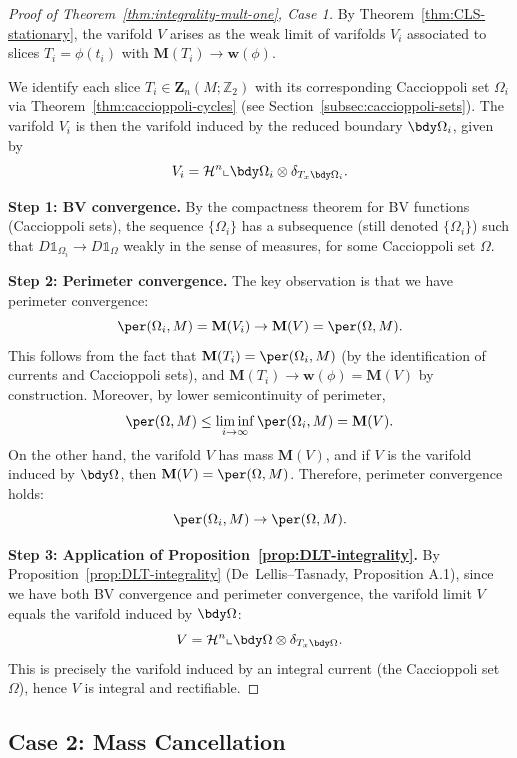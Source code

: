 \begin{proof}[Proof of Theorem~\ref{thm:integrality-mult-one}, Case 1]
By Theorem~\ref{thm:CLS-stationary}, the varifold $V$ arises as the weak limit of varifolds $V_i$
associated to slices $T_i = \phi(t_i)$ with $\mathbf{M}(T_i) \to \mathbf{w}(\phi)$.

We identify each slice $T_i \in \mathbf{Z}_n(M;\mathbb{Z}_2)$ with its corresponding Caccioppoli set
$\Omega_i$ via Theorem~\ref{thm:caccioppoli-cycles} (see Section~\ref{subsec:caccioppoli-sets}). The
varifold $V_i$ is then the varifold induced by the reduced boundary $\bdy\Omega_i$, given by
\[
    V_i = \mathcal{H}^n \llcorner \bdy\Omega_i \otimes \delta_{T_x\bdy\Omega_i}.
\]

\textbf{Step 1: BV convergence.} By the compactness theorem for BV functions (Caccioppoli sets), the
sequence $\{\Omega_i\}$ has a subsequence (still denoted $\{\Omega_i\}$) such that
$D\mathbb{1}_{\Omega_i} \to D\mathbb{1}_\Omega$ weakly in the sense of measures, for some
Caccioppoli set $\Omega$.

\textbf{Step 2: Perimeter convergence.} The key observation is that we have perimeter convergence:
\[
    \per(\Omega_i, M) = \mathbf{M}(V_i) \to \mathbf{M}(V) = \per(\Omega, M).
\]
This follows from the fact that $\mathbf{M}(T_i) = \per(\Omega_i, M)$ (by the identification of
currents and Caccioppoli sets), and $\mathbf{M}(T_i) \to \mathbf{w}(\phi) = \mathbf{M}(V)$ by
construction. Moreover, by lower semicontinuity of perimeter,
\[
    \per(\Omega, M) \leq \liminf_{i\to\infty} \per(\Omega_i, M) = \mathbf{M}(V).
\]
On the other hand, the varifold $V$ has mass $\mathbf{M}(V)$, and if $V$ is the varifold induced by
$\bdy\Omega$, then $\mathbf{M}(V) = \per(\Omega, M)$. Therefore, perimeter convergence holds:
\[
    \per(\Omega_i, M) \to \per(\Omega, M).
\]

\textbf{Step 3: Application of Proposition~\ref{prop:DLT-integrality}.} By
Proposition~\ref{prop:DLT-integrality} (De~Lellis--Tasnady, Proposition A.1), since we have both
BV convergence and perimeter convergence, the varifold limit $V$ equals the varifold induced by
$\bdy\Omega$:
\[
    V = \mathcal{H}^n \llcorner \bdy\Omega \otimes \delta_{T_x\bdy\Omega}.
\]
This is precisely the varifold induced by an integral current (the Caccioppoli set $\Omega$), hence
$V$ is integral and rectifiable.
\end{proof}

\subsection{Case 2: Mass Cancellation}

